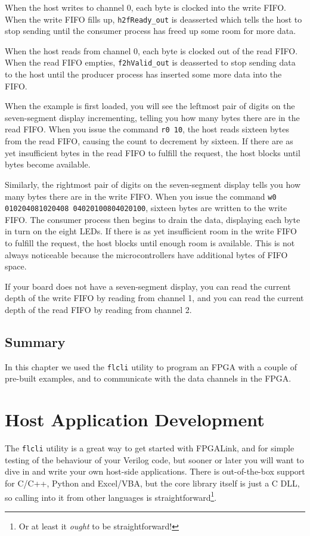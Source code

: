 
When the host writes to channel 0, each byte is clocked into the write FIFO. When the write FIFO fills up, \texttt{h2fReady\_out} is deasserted which tells the host to stop sending until the consumer process has freed up some room for more data.

When the host reads from channel 0, each byte is clocked out of the read FIFO. When the read FIFO empties, \texttt{f2hValid\_out} is deasserted to stop sending data to the host until the producer process has inserted some more data into the FIFO.

When the example is first loaded, you will see the leftmost pair of digits on the seven-segment display incrementing, telling you how many bytes there are in the read FIFO. When you issue the command \texttt{r0 10}, the host reads sixteen bytes from the read FIFO, causing the count to decrement by sixteen. If there are as yet insufficient bytes in the read FIFO to fulfill the request, the host blocks until bytes become available.

Similarly, the rightmost pair of digits on the seven-segment display tells you how many bytes there are in the write FIFO. When you issue the command \texttt{w0 010204081020408 04020100804020100}, sixteen bytes are written to the write FIFO. The consumer process then begins to drain the data, displaying each byte in turn on the eight LEDs. If there is as yet insufficient room in the write FIFO to fulfill the request, the host blocks until enough room is available. This is not always noticeable because the microcontrollers have additional bytes of FIFO space.

If your board does not have a seven-segment display, you can read the current depth of the write FIFO by reading from channel 1, and you can read the current depth of the read FIFO by reading from channel 2.

\subsection{Summary}
In this chapter we used the \texttt{flcli} utility to program an FPGA with a couple of pre-built examples, and to communicate with the data channels in the FPGA.

\newpage
\section{Host Application Development}
The \texttt{flcli} utility is a great way to get started with FPGALink, and for simple testing of the behaviour of your Verilog code, but sooner or later you will want to dive in and write your own host-side applications. There is out-of-the-box support for C/C++, Python and Excel/VBA, but the core library itself is just a C DLL, so calling into it from other languages is straightforward\footnote{Or at least it \textit{ought} to be straightforward!}.

